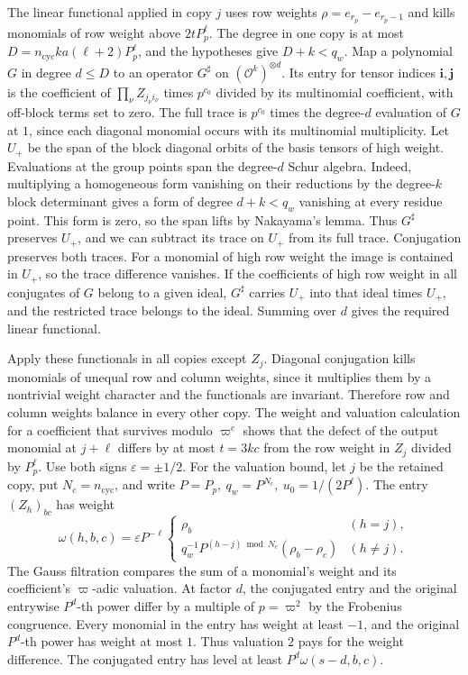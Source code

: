 The linear functional applied in copy \(j\) uses row weights
\(\rho=e_{r_p}-e_{r_p-1}\) and kills monomials of row weight above
\(2tP_p^\ell\). The degree in one copy is at most
\(D=n_\mathrm{cyc}ka(\ell+2)P_p^\ell\), and the hypotheses give
\(D+k<q_w\). Map a polynomial \(G\) in degree \(d\le D\)
to an operator \(G^\sharp\) on \((\mathcal O^k)^{\otimes d}\).
Its entry for tensor indices \(\boldsymbol i,\boldsymbol j\)
is the coefficient of \(\prod_\nu Z_{j_\nu i_\nu}\) times
\(p^{c_0}\) divided by its multinomial coefficient, with
off-block terms set to zero.
The full trace is \(p^{c_0}\) times the degree-\(d\) evaluation
of \(G\) at \(1\), since each diagonal monomial occurs with
its multinomial multiplicity.
Let \(U_+\) be the span of the block diagonal orbits of the
basis tensors of high weight.
Evaluations at the group points span the degree-\(d\) Schur algebra.
Indeed, multiplying a homogeneous form vanishing on their reductions
by the degree-\(k\) block determinant gives a form of degree
\(d+k<q_w\) vanishing at every residue point. This form is zero,
so the span lifts by Nakayama's lemma.
Thus \(G^\sharp\) preserves \(U_+\), and we can subtract its trace
on \(U_+\) from its full trace.
Conjugation preserves both traces. For a monomial of high row
weight the image is contained in \(U_+\), so the trace difference
vanishes. If the coefficients of high row weight in all
conjugates of \(G\) belong to a given ideal, \(G^\sharp\)
carries \(U_+\) into that ideal times \(U_+\), and the
restricted trace belongs to the ideal. Summing over \(d\) gives
the required linear functional.

Apply these functionals in all copies except \(Z_j\).
Diagonal conjugation kills monomials of unequal row and column
weights, since it multiplies them by a nontrivial weight
character and the functionals are invariant.
Therefore row and column weights balance in every other copy.
The weight and valuation calculation for a coefficient that
survives modulo \(\varpi^c\) shows that the defect of the output
monomial at \(j+\ell\) differs by at most \(t=3kc\) from the
row weight in \(Z_j\) divided by \(P_p^\ell\).
Use both signs \(\varepsilon=\pm1/2\).
For the valuation bound, let \(j\) be the retained copy, put
\(N_c=n_\mathrm{cyc}\), and write \(P=P_p,\ q_w=P^{N_c},\
u_0=1/(2P^\ell)\). The entry \((Z_h)_{bc}\) has weight
\[
 \omega(h,b,c)=\varepsilon P^{-\ell}
 \begin{cases}
 \rho_b & (h=j),\\
 q_w^{-1}P^{(h-j)\bmod N_c}(\rho_b-\rho_c) & (h\ne j).
 \end{cases}
\]
The Gauss filtration compares the sum of a monomial's weight and
its coefficient's \(\varpi\)-adic valuation. At factor \(d\), the
conjugated entry and the original entrywise \(P^d\)-th power differ
by a multiple of \(p=\varpi^2\) by the Frobenius congruence.
Every monomial in the entry has weight at least \(-1\), and the
original \(P^d\)-th power has weight at most \(1\). Thus valuation
\(2\) pays for the weight difference. The conjugated entry has
level at least \(P^d\omega(s-d,b,c)\).

